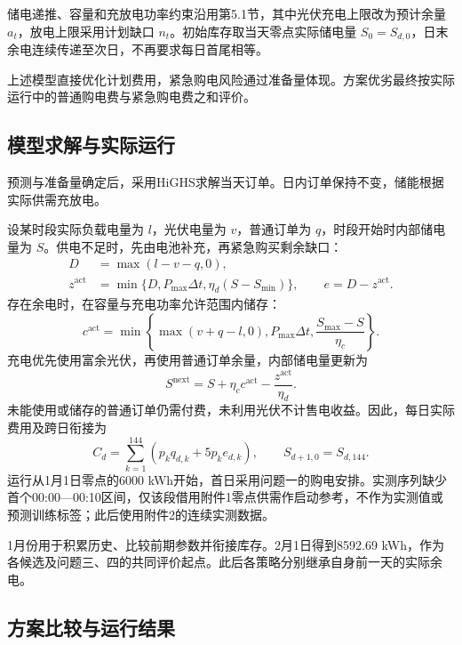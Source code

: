 储电递推、容量和充放电功率约束沿用第5.1节，其中光伏充电上限改为预计余量 $a_t$，放电上限采用计划缺口 $n_t$。初始库存取当天零点实际储电量 $S_0=S_{d,0}$，日末余电连续传递至次日，不再要求每日首尾相等。

上述模型直接优化计划费用，紧急购电风险通过准备量体现。方案优劣最终按实际运行中的普通购电费与紧急购电费之和评价。

\subsection{模型求解与实际运行}
预测与准备量确定后，采用HiGHS求解当天订单。日内订单保持不变，储能根据实际供需充放电。

设某时段实际负载电量为 $l$，光伏电量为 $v$，普通订单为 $q$，时段开始时内部储电量为 $S$。供电不足时，先由电池补充，再紧急购买剩余缺口：
\begin{align}
D&=\max(l-v-q,0),\label{eq:q2_actual_deficit}\\
z^{\mathrm{act}}&=\min\{D,P_{\max}\Delta t,\eta_d(S-S_{\min})\},\qquad e=D-z^{\mathrm{act}}.\label{eq:q2_emergency}
\end{align}
存在余电时，在容量与充电功率允许范围内储存：
\begin{equation}
c^{\mathrm{act}}=\min\left\{\max(v+q-l,0),P_{\max}\Delta t,\frac{S_{\max}-S}{\eta_c}\right\}.
\label{eq:q2_actual_charge}
\end{equation}
充电优先使用富余光伏，再使用普通订单余量，内部储电量更新为
\begin{equation}
S^{\mathrm{next}}=S+\eta_cc^{\mathrm{act}}-\frac{z^{\mathrm{act}}}{\eta_d}.
\label{eq:q2_actual_soc}
\end{equation}
未能使用或储存的普通订单仍需付费，未利用光伏不计售电收益。因此，每日实际费用及跨日衔接为
\begin{equation}
C_d=\sum_{k=1}^{144}\left(p_kq_{d,k}+5p_ke_{d,k}\right),\qquad S_{d+1,0}=S_{d,144}.
\label{eq:q2_daily_cost}
\end{equation}
运行从1月1日零点的6000 kWh开始，首日采用问题一的购电安排。实测序列缺少首个00:00—00:10区间，仅该段借用附件1零点供需作启动参考，不作为实测值或预测训练标签；此后使用附件2的连续实测数据。

1月份用于积累历史、比较前期参数并衔接库存。2月1日得到8592.69 kWh，作为各候选及问题三、四的共同评价起点。此后各策略分别继承自身前一天的实际余电。

\subsection{方案比较与运行结果}
